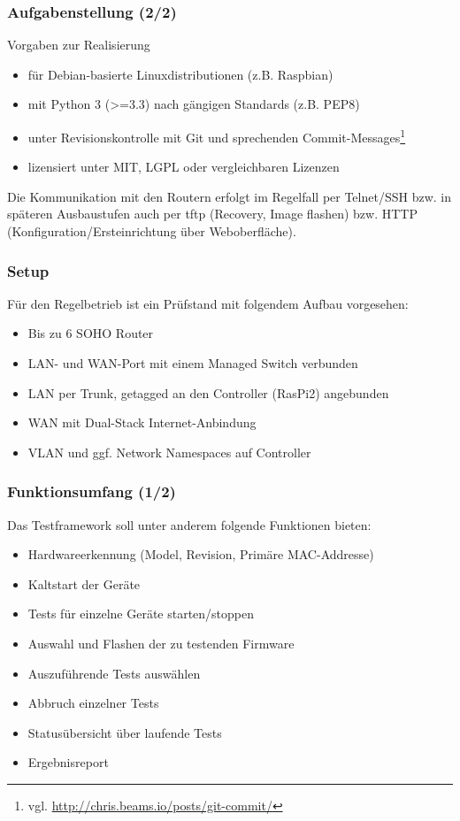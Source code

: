 \documentclass[accentcolor=tud6b,colorbacktitle,inverttitle,landscape,german,presentation,t]{tudbeamer}
\begin{document}
	\begin{frame}
		\frametitle{Aufgabenstellung (2/2)}
		\vfill
		Vorgaben zur Realisierung
		\begin{itemize}
			\item für Debian-basierte Linuxdistributionen (z.B. Raspbian)
			\item mit Python 3 (>=3.3) nach gängigen Standards (z.B. PEP8)
			\item unter Revisionskontrolle mit Git und sprechenden Commit-Messages\footnote{vgl. \url{http://chris.beams.io/posts/git-commit/}}
			\item lizensiert unter MIT, LGPL oder vergleichbaren Lizenzen
		\end{itemize}
		\vfill
		Die Kommunikation mit den Routern erfolgt im Regelfall per Telnet/SSH bzw. in späteren Ausbaustufen auch per tftp (Recovery, Image flashen) bzw. HTTP (Konfiguration/Ersteinrichtung über
		Weboberfläche).
		\vfill
	\end{frame}
	
	\begin{frame}
		\frametitle{Setup}
		    \vfill
		    Für den Regelbetrieb ist ein Prüfstand mit folgendem Aufbau vorgesehen:
		    \vfill
			\begin{itemize}
			    \item Bis zu 6 SOHO Router
		    	\item LAN- und WAN-Port mit einem Managed Switch verbunden
			    \item LAN per Trunk, getagged an den Controller (RasPi2) angebunden
			    \item WAN mit Dual-Stack Internet-Anbindung
			    \item VLAN und ggf. Network Namespaces auf Controller
		    \end{itemize}
			\vfill
	\end{frame}

	\begin{frame}
		\frametitle{Funktionsumfang (1/2)}
		\vfill
		Das Testframework soll unter anderem folgende Funktionen bieten:
		\vfill
		\begin{itemize}
			\item Hardwareerkennung (Model, Revision, Primäre MAC-Addresse)
			\item Kaltstart der Geräte
			\item Tests für einzelne Geräte starten/stoppen
			\item Auswahl und Flashen der zu testenden Firmware
			\item Auszuführende Tests auswählen
			\item Abbruch einzelner Tests
			\item Statusübersicht über laufende Tests
			\item Ergebnisreport
		\end{itemize}	
	\end{frame}
	
\end{document}
